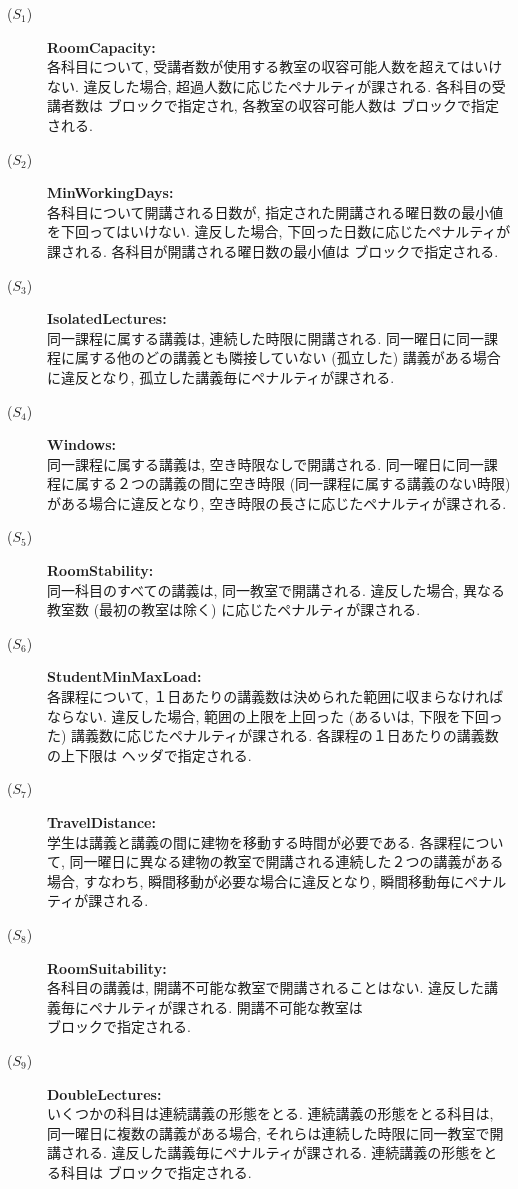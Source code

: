 \begin{description}
\item[($S_1$)] \textbf{RoomCapacity:}\\
各科目について, 受講者数が使用する教室の収容可能人数を超えてはいけない. 違反した場合, 超過人数に応じたペナルティが課される. 各科目の受講者数は  ブロックで指定され, 各教室の収容可能人数は  ブロックで指定される.
\item[($S_2$)] \textbf{MinWorkingDays:}\\
各科目について開講される日数が, 指定された開講される曜日数の最小値を下回ってはいけない. 違反した場合, 下回った日数に応じたペナルティが課される. 各科目が開講される曜日数の最小値は  ブロックで指定される.
\item[($S_3$)] \textbf{IsolatedLectures:}\\
同一課程に属する講義は, 連続した時限に開講される. 同一曜日に同一課程に属する他のどの講義とも隣接していない (孤立した) 講義がある場合に違反となり, 孤立した講義毎にペナルティが課される.
\item[($S_4$)] \textbf{Windows:}\\
同一課程に属する講義は, 空き時限なしで開講される. 同一曜日に同一課程に属する２つの講義の間に空き時限 (同一課程に属する講義のない時限) がある場合に違反となり, 空き時限の長さに応じたペナルティが課される.
\item[($S_5$)] \textbf{RoomStability:}\\
同一科目のすべての講義は, 同一教室で開講される. 違反した場合, 異なる教室数 (最初の教室は除く) に応じたペナルティが課される.
\item[($S_6$)] \textbf{StudentMinMaxLoad:}\\
各課程について, １日あたりの講義数は決められた範囲に収まらなければならない. 違反した場合, 範囲の上限を上回った (あるいは, 下限を下回った) 講義数に応じたペナルティが課される. 各課程の１日あたりの講義数の上下限は  ヘッダで指定される.
\item[($S_7$)] \textbf{TravelDistance:}\\
学生は講義と講義の間に建物を移動する時間が必要である. 各課程について, 同一曜日に異なる建物の教室で開講される連続した２つの講義がある場合, すなわち, 瞬間移動が必要な場合に違反となり, 瞬間移動毎にペナルティが課される.
\item[($S_8$)] \textbf{RoomSuitability:}\\
各科目の講義は, 開講不可能な教室で開講されることはない. 違反した講義毎にペナルティが課される. 開講不可能な教室は \\
 ブロックで指定される.
\item[($S_9$)] \textbf{DoubleLectures:}\\
いくつかの科目は連続講義の形態をとる. 連続講義の形態をとる科目は, 同一曜日に複数の講義がある場合, それらは連続した時限に同一教室で開講される. 違反した講義毎にペナルティが課される. 連続講義の形態をとる科目は  ブロックで指定される.
\end{description}

